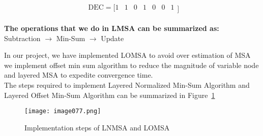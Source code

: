 \[ \begin{matrix}\text{DEC}=[1&1&0&1&0&0&1\\\end{matrix}] \]
\begin{GrayBox}
    \textbf{The operations that we do in LMSA can be summarized as:}\\
    Subtraction $\rightarrow$ Min-Sum $\rightarrow$ Update
\end{GrayBox}
In our project, we have implemented LOMSA to avoid over estimation of MSA we implement  offset min sum algorithm to reduce the magnitude of variable node and layered MSA to expedite convergence time. \\
The steps required to implement Layered Normalized Min-Sum Algorithm and Layered Oﬀset Min-Sum Algorithm can be summarized in Figure~\ref{fig:LOMSA Algorithm}
\begin{figure}[ht]
    \centering
    \texttt{[image: image077.png]}
    \caption{Implementation steps of LNMSA and LOMSA}
    \label{fig:LOMSA Algorithm}
\end{figure}
